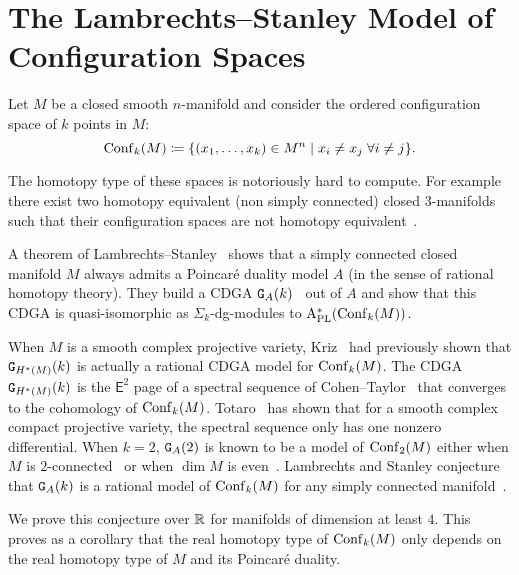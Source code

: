 
\chapter{The Lambrechts--Stanley Model of Configuration Spaces}
\label{chap.2}

Let $M$ be a closed smooth $n$-manifold and consider the ordered configuration space of $k$ points in $M$:
\[ \operatorname{Conf}_{k}(M) \coloneqq \{ (x_{1}, \dots, x_{k}) \in M^{n} \mid x_{i} \neq x_{j} \; \forall i \neq j \}. \]

The homotopy type of these spaces is notoriously hard to compute.
For example there exist two homotopy equivalent (non simply connected) closed $3$-manifolds such that their configuration spaces are not homotopy equivalent~\cite{LongoniSalvatore2005}.

A theorem of Lambrechts--Stanley~\cite{LambrechtsStanley2008} shows that a simply connected closed manifold $M$ always admits a Poincaré duality model $A$ (in the sense of rational homotopy theory).
They build a CDGA $\mathtt{G}_{A}(k)$~\cite{LambrechtsStanley2008a} out of $A$ and show that this CDGA is quasi-isomorphic as $\Sigma_{k}$-dg-modules to $\mathrm{A}^{*}_{\mathrm{PL}}(\operatorname{Conf}_{k}(M))$.

When $M$ is a smooth complex projective variety, Kriz~\cite{Kriz1994} had previously shown that $\mathtt{G}_{H^{*}(M)}(k)$ is actually a rational CDGA model for $\operatorname{Conf}_{k}(M)$.
The CDGA $\mathtt{G}_{H^{*}(M)}(k)$ is the $\mathsf{E}^{2}$ page of a spectral sequence of Cohen--Taylor~\cite{CohenTaylor1978} that converges to the cohomology of $\operatorname{Conf}_{k}(M)$.
Totaro~\cite{Totaro1996} has shown that for a smooth complex compact projective variety, the spectral sequence only has one nonzero differential.
When $k = 2$, $\mathtt{G}_{A}(2)$ is known to be a model of $\operatorname{Conf}_{2}(M)$ either when $M$ is $2$-connected~\cite{LambrechtsStanley2004} or when $\dim M$ is even~\cite{CordovaBulens2015}.
Lambrechts and Stanley conjecture that $\mathtt{G}_{A}(k)$ is a rational model of $\operatorname{Conf}_{k}(M)$ for any simply connected manifold~\cite{LambrechtsStanley2008}.

We prove this conjecture over $\mathbb{R}$ for manifolds of dimension at least $4$.
This proves as a corollary that the real homotopy type of $\operatorname{Conf}_{k}(M)$ only depends on the real homotopy type of $M$ and its Poincaré duality.

